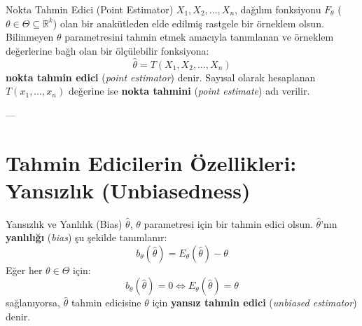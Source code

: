 \documentclass[11pt,a4paper]{article}
\begin{document}
\begin{tanim}{Nokta Tahmin Edici (Point Estimator)}
$X_1, X_2, \dots, X_n$, dağılım fonksiyonu $F_\theta$ ($\theta \in \Theta \subseteq \mathbb{R}^k$) olan bir anakütleden elde edilmiş rastgele bir örneklem olsun. Bilinmeyen $\theta$ parametresini tahmin etmek amacıyla tanımlanan ve örneklem değerlerine bağlı olan bir ölçülebilir fonksiyona:
\[
\hat{\theta} = T(X_1, X_2, \dots, X_n)
\]
\textbf{nokta tahmin edici} (\textit{point estimator}) denir. Sayısal olarak hesaplanan $T(x_1, \dots, x_n)$ değerine ise \textbf{nokta tahmini} (\textit{point estimate}) adı verilir.
\end{tanim}

---

\section{Tahmin Edicilerin Özellikleri: Yansızlık (Unbiasedness)}

\begin{tanim}{Yansızlık ve Yanlılık (Bias)}
$\hat{\theta}$, $\theta$ parametresi için bir tahmin edici olsun. $\hat{\theta}$'nın \textbf{yanlılığı} (\textit{bias}) şu şekilde tanımlanır:
\[
b_\theta(\hat{\theta}) = E_\theta(\hat{\theta}) - \theta
\]
Eğer her $\theta \in \Theta$ için:
\[
b_\theta(\hat{\theta}) = 0 \iff E_\theta(\hat{\theta}) = \theta
\]
sağlanıyorsa, $\hat{\theta}$ tahmin edicisine $\theta$ için \textbf{yansız tahmin edici} (\textit{unbiased estimator}) denir.
\end{tanim}
\end{document}
